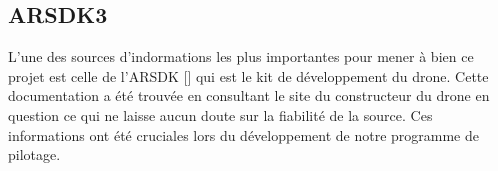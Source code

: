 \subsection{ARSDK3}
L'une des sources d'indormations les plus importantes pour mener à bien ce projet est celle de l'ARSDK [\cite{ARSDK}] qui est le kit de développement du drone. Cette documentation a été trouvée en consultant le site du constructeur du drone en question ce qui ne laisse aucun doute sur la fiabilité de la source. Ces informations ont été cruciales lors du développement de notre programme de pilotage.